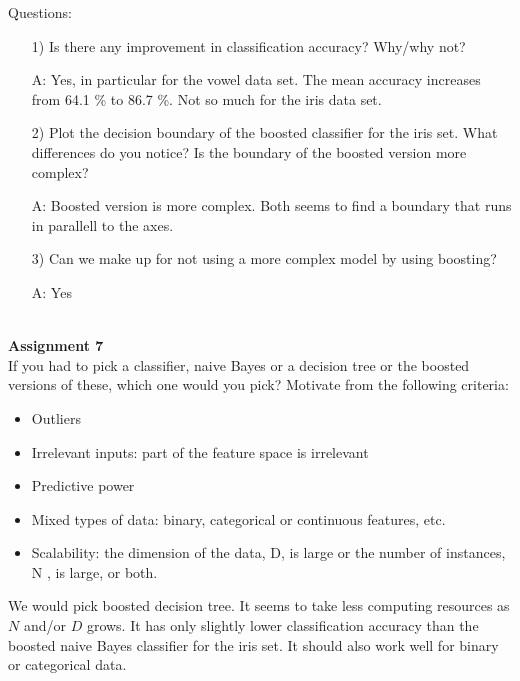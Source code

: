 \documentclass[a4paper,10pt]{article}
\begin{document}
\newpage
\noindent
Questions:
\begin{itemize}
  \item[1)] Is there any improvement in classification accuracy? Why/why not?
  \item[A:] Yes, in particular for the vowel data set. The mean accuracy increases from
    64.1 \% to 86.7 \%. Not so much for the iris data set. 
  \item[2)] Plot the decision boundary of the boosted classifier for the iris set.
    What differences do you notice? Is the boundary of the boosted version more
    complex?
  \item[A:] Boosted version is more complex. Both seems to find a boundary that runs
    in parallell to the axes.
  \item[3)] Can we make up for not using a more complex model by using boosting?
  \item[A:] Yes
\end{itemize}






$ $\\
\textbf{Assignment 7}
\\
If you had to pick a classifier, naive Bayes or a decision tree or
the boosted versions of these, which one would you pick? Motivate from the following
criteria:
\begin{itemize}
  \item Outliers
  \item Irrelevant inputs: part of the feature space is irrelevant
  \item Predictive power
  \item Mixed types of data: binary, categorical or continuous features, etc.
  \item Scalability: the dimension of the data, D, is large or the number of instances,
    N , is large, or both.
\end{itemize}
We would pick boosted decision tree. It seems to take less computing resources as $N$ and/or $D$
grows. It has only slightly lower classification accuracy 
than the boosted naive Bayes classifier for the iris set. It should also work well for binary or 
categorical data.
\end{document}

